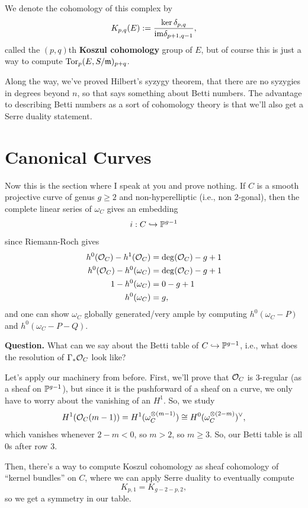 \documentclass[12pt]{article}
\begin{document}
\begin{defn}
    We denote the cohomology of this complex by
    \[K_{p,q}(E) := \frac{\ker \delta_{p,q}}{\im \delta_{p+1,q-1}},\]
    called the $(p,q)$th \textbf{Koszul cohomology} group of $E$, but of course this is just a way to compute $\Tor_p(E,S/\fm)_{p+q}$.
\end{defn}

Along the way, we've proved Hilbert's syzygy theorem, that there are no syzygies in degrees beyond $n$, so that says something about Betti numbers. The advantage to describing Betti numbers as a sort of cohomology theory is that we'll also get a Serre duality statement.

\section{Canonical Curves}

Now this is the section where I speak at you and prove nothing. If $C$ is a smooth projective curve of genus $g\geq 2$ and non-hyperelliptic (i.e., non 2-gonal), then the complete linear series of $\omega_C$ gives an embedding
\[i: C \hookrightarrow \P^{g-1}\]
since Riemann-Roch gives
\begin{align*}
    h^0(\cO_C) - h^1(\cO_C) &= \deg(\cO_C) - g + 1\\
    h^0(\cO_C) - h^0(\omega_C) &= \deg(\cO_C) - g + 1\\
    1 - h^0(\omega_C) &= 0 - g + 1\\
    h^0(\omega_C) &= g,
\end{align*}
and one can show $\omega_C$ globally generated/very ample by computing $h^0(\omega_C-P)$ and $h^0(\omega_C-P-Q)$.

\textbf{Question.} What can we say about the Betti table of $C\hookrightarrow \P^{g-1}$, i.e., what does the resolution of $\Gamma_* \cO_C$ look like?

Let's apply our machinery from before. First, we'll prove that $\cO_C$ is $3$-regular (as a sheaf on $\P^{g-1}$), but since it is the pushforward of a sheaf on a curve, we only have to worry about the vanishing of an $H^1$. So, we study
\[H^1(\cO_C(m-1)) = H^1(\omega_C^{\otimes(m-1)}) \cong H^0(\omega_C^{\otimes (2-m)})^\vee,\]
which vanishes whenever $2-m<0$, so $m>2$, so $m\geq 3$. So, our Betti table is all 0s after row 3.

Then, there's a way to compute Koszul cohomology as sheaf cohomology of ``kernel bundles'' on $C$, where we can apply Serre duality to eventually compute
\[K_{p,1} = K_{g-2-p,2},\]
so we get a symmetry in our table.
\end{document}
